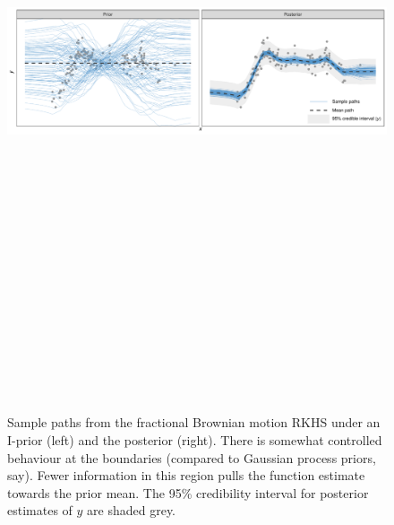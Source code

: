 \documentclass{beamer}
\newlength{\twocolwid}
\begin{document}
\begin{frame}[t]
\begin{columns}[t]
\begin{column}{\twocolwid}
\vspace{-1.8cm}
\begin{figure}
\includegraphics[width=\linewidth, height=20cm]{figure/iprior_function2}
\vspace{-1.8cm}
\caption{Sample paths from the fractional Brownian motion RKHS under an I-prior (left) and the posterior (right). There is somewhat controlled behaviour at the boundaries (compared to Gaussian process priors, say). Fewer information in this region pulls the function estimate towards the prior mean. The 95\% credibility interval for posterior estimates of $y$ are shaded grey.}
\end{figure}




\end{column}
\end{columns}
\end{frame}
\end{document}
